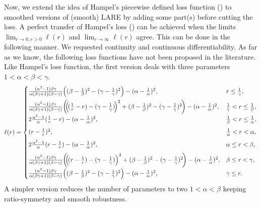 \documentclass[10pt]{article}
\begin{document}
Now, we extend the idea of Hampel's piecewise defined loss function (\cite[Chapter 2.6: Ex. 1]{HampelEtAl1986}) to smoothed versions of (smooth) LARE by adding some part(s) before cutting the loss. 
A perfect transfer of Hampel's loss (\cite[Chapter 2.6: Ex. 1]{HampelEtAl1986}) can be achieved when the limits $\lim_{r \to 0, r>0} \ell(r)$ and $\lim_{r \to \infty} \ell(r)$ agree.
This can be done in the following manner. 
We requested continuity and continuous differentiability. 
As far as we know, the following loss functions have not been proposed in the literature. 
Like Hampel's loss function, the first version deals with three parameters $1 < \alpha < \beta < \gamma$.
\begin{equation} \label{smoothrobustFehler4}
	\ell(r) = 
	\begin{cases}
		\frac{(\alpha^2-1)\beta\gamma}{\alpha(\beta\gamma+1)(\beta - \gamma)} \Bigl((\beta - \frac{1}{\beta})^2-(\gamma-\frac{1}{\gamma})^2\Bigr) - (\alpha - \frac{1}{\alpha})^2, & r \leq \frac{1}{\gamma},  \\[6pt]
		\frac{(\alpha^2-1)\beta\gamma}{\alpha(\beta\gamma+1)(\beta - \gamma)}\biggl(\!\!\Bigl(\!(\frac{1}{r}-r)-(\gamma-\frac{1}{\gamma})\!\Bigr)^2 + (\beta - \frac{1}{\beta})^2-(\gamma-\frac{1}{\gamma})^2\!\biggr)- (\alpha - \frac{1}{\alpha})^2, & \frac{1}{\gamma} < r \leq \frac{1}{\beta}, \\[6pt]
		2\frac{\alpha^2-1}{\alpha}(\frac{1}{r}-r) - (\alpha-\frac{1}{\alpha})^2, &\frac{1}{\beta} < r \leq \frac{1}{\alpha}, \\[6pt]
		(r-\frac{1}{r})^2, & \frac{1}{\alpha} < r < \alpha, \\[6pt]
		2\frac{\alpha^2-1}{\alpha}(r-\frac{1}{r}) - (\alpha-\frac{1}{\alpha})^2, & \alpha \leq r < \beta, \\[6pt]
		\frac{(\alpha^2-1)\beta\gamma}{\alpha(\beta\gamma+1)(\beta - \gamma)}\biggl(\!\!\Bigl(\!(r - \frac{1}{r})-(\gamma-\frac{1}{\gamma})\Bigr)^2 + (\beta - \frac{1}{\beta})^2-(\gamma-\frac{1}{\gamma})^2 \!\biggr) - (\alpha - \frac{1}{\alpha})^2, & \beta \leq r < \gamma, \\[6pt]
		\frac{(\alpha^2-1)\beta\gamma}{\alpha(\beta\gamma+1)(\beta - \gamma)} \Bigl((\beta - \frac{1}{\beta})^2-(\gamma-\frac{1}{\gamma})^2\Bigr) - (\alpha - \frac{1}{\alpha})^2, & \gamma \leq r.
	\end{cases}
\end{equation}
A simpler version reduces the number of parameters to two $1 < \alpha < \beta$ keeping ratio-symmetry and smooth robustness.
\end{document}
